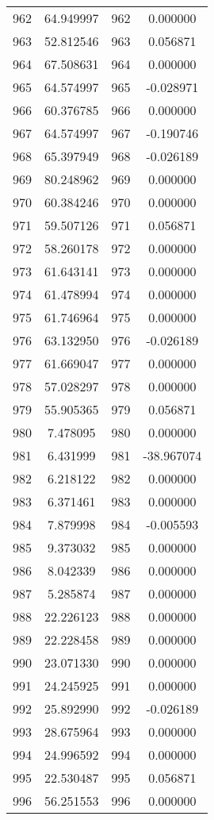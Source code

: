 \documentclass[12pt]{article}
\begin{document}
\begin{longtable}{@{}cccc@{}}
962 & 64.949997 & 962 & 0.000000 \\
963 & 52.812546 & 963 & 0.056871 \\
964 & 67.508631 & 964 & 0.000000 \\
965 & 64.574997 & 965 & -0.028971 \\
966 & 60.376785 & 966 & 0.000000 \\
967 & 64.574997 & 967 & -0.190746 \\
968 & 65.397949 & 968 & -0.026189 \\
969 & 80.248962 & 969 & 0.000000 \\
970 & 60.384246 & 970 & 0.000000 \\
971 & 59.507126 & 971 & 0.056871 \\
972 & 58.260178 & 972 & 0.000000 \\
973 & 61.643141 & 973 & 0.000000 \\
974 & 61.478994 & 974 & 0.000000 \\
975 & 61.746964 & 975 & 0.000000 \\
976 & 63.132950 & 976 & -0.026189 \\
977 & 61.669047 & 977 & 0.000000 \\
978 & 57.028297 & 978 & 0.000000 \\
979 & 55.905365 & 979 & 0.056871 \\
980 & 7.478095 & 980 & 0.000000 \\
981 & 6.431999 & 981 & -38.967074 \\
982 & 6.218122 & 982 & 0.000000 \\
983 & 6.371461 & 983 & 0.000000 \\
984 & 7.879998 & 984 & -0.005593 \\
985 & 9.373032 & 985 & 0.000000 \\
986 & 8.042339 & 986 & 0.000000 \\
987 & 5.285874 & 987 & 0.000000 \\
988 & 22.226123 & 988 & 0.000000 \\
989 & 22.228458 & 989 & 0.000000 \\
990 & 23.071330 & 990 & 0.000000 \\
991 & 24.245925 & 991 & 0.000000 \\
992 & 25.892990 & 992 & -0.026189 \\
993 & 28.675964 & 993 & 0.000000 \\
994 & 24.996592 & 994 & 0.000000 \\
995 & 22.530487 & 995 & 0.056871 \\
996 & 56.251553 & 996 & 0.000000 \\

\end{longtable}
\end{document}
